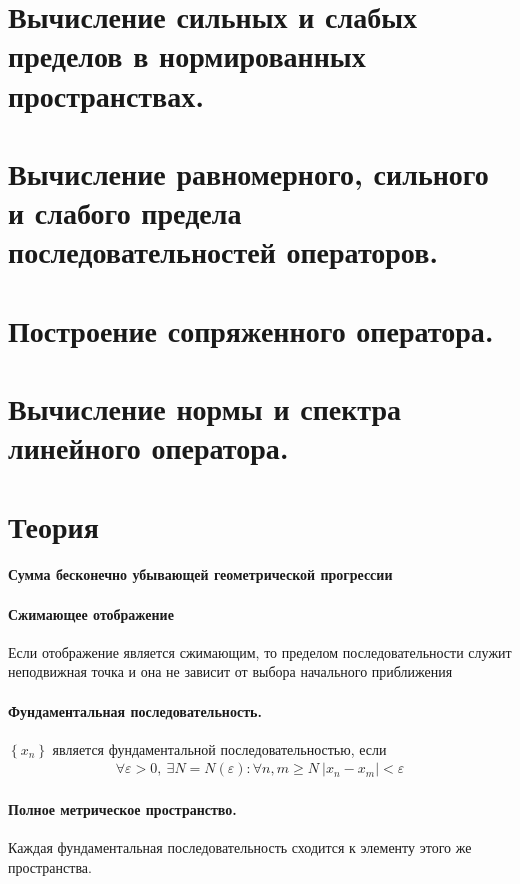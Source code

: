 \documentclass{article}[12pt]
\begin{document}
\section{Вычисление сильных и слабых пределов в нормированных
пространствах.}
\section{Вычисление равномерного, сильного и слабого предела
последовательностей операторов.}
\section{Построение сопряженного оператора.}
\section{Вычисление нормы и спектра линейного оператора.}

\section{Теория}

\paragraph{Сумма бесконечно убывающей геометрической прогрессии}
\paragraph{Сжимающее отображение}
Если отображение является сжимающим, то пределом последовательности служит
неподвижная точка и она не зависит от выбора начального приближения
\paragraph{Фундаментальная последовательность.}
$\left\{x_{n}\right\}$ является фундаментальной последовательностью, если
\begin{eqnarray*}
    \forall\varepsilon>0,\ \exists N=N(\varepsilon):\forall n,m\geqslant N
    \ \left|x_{n}-x_{m}\right|<\varepsilon
\end{eqnarray*}

\paragraph{Полное метрическое пространство.}
Каждая фундаментальная последовательность сходится к элементу этого же пространства.
\end{document}
